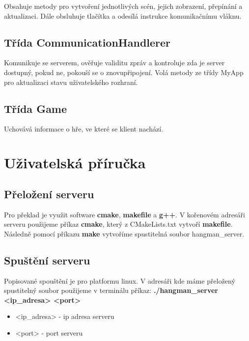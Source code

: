 \documentclass[12pt]{report}
\begin{document}
	Obsahuje metody pro vytvoření jednotlivých scén, jejich zobrazení, přepínání a aktualizaci. Dále obsluhuje tlačítka a odesílá instrukce komunikačnímu vláknu.
	
	\section{Třída CommunicationHandlerer}
	
	Komunikuje se serverem, ověřuje validitu zpráv a kontroluje zda je server dostupný, pokud ne, pokouší se o znovupřipojení. Volá metody ze třídy MyApp pro aktualizaci stavu uživatelského rozhraní.
	
	\section{Třída Game}
	
	Uchovává informace o hře, ve které se klient nachází. 
	
	\chapter{Uživatelská příručka }
	
	\section{Přeložení serveru}
	
	Pro překlad je využit software \textbf{cmake}, \textbf{makefile} a \textbf{g++}. V kořenovém adresáři serveru použijeme příkaz \textbf{cmake}, který z CMakeLists.txt vytvoří \textbf{makefile}. Následně pomocí příkazu \textbf{make} vytvoříme spustitelná soubor hangman\_server.
	
	\section{Spuštění serveru}
	
	Popisované spouštění je pro platformu linux. V adresáři kde máme přeložený spustitelný soubor použijeme v terminálu příkaz: \textbf{./hangman\_server {\textless}ip\_adresa{\textgreater} {\textless}port{\textgreater}}
	
	\begin{itemize}
		\item {\textless}ip\_adresa{\textgreater} - ip adresa serveru
		\item {\textless}port{\textgreater} - port serveru
	\end{itemize}
	
\end{document}
